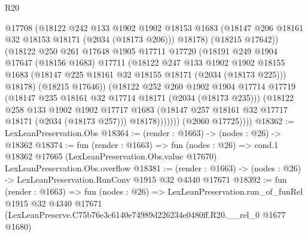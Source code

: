 \begin{lexlean}{R20}
\begin{coremodule}
                    @17708
                    (@18122
                      @242
                      @133
                      @1902
                      @1902
                      @18153
                      @1683
                      (@18147 @206 @18161 @32 @18153 @18171 (@2034 (@18173 @206)))
                      @18178)
                    (@18215 @17642))
                  (@18122
                    @250
                    @261
                    @17648
                    @1905
                    @17711
                    @17720
                    (@18191
                      @249
                      @1904
                      @17647
                      (@18156 @1683)
                      @17711
                      (@18122
                        @247
                        @133
                        @1902
                        @1902
                        @18155
                        @1683
                        (@18147 @225 @18161 @32 @18155 @18171 (@2034 (@18173 @225)))
                        @18178)
                      (@18215 @17646))
                    (@18122
                      @252
                      @260
                      @1902
                      @1904
                      @17714
                      @17719
                      (@18147 @235 @18161 @32 @17714 @18171 (@2034 (@18173 @235)))
                      (@18122
                        @258
                        @133
                        @1902
                        @1902
                        @17717
                        @1683
                        (@18147 @257 @18161 @32 @17717 @18171 (@2034 (@18173 @257)))
                        @18178)))))))
          (@2060 @17725))))
@18362 := LexLeanPreservation.Obs
@18364 := (render : @1663) -> (nodes : @26) -> @18362
@18374 := fun (render : @1663) =>
  fun (nodes : @26) =>
  cond.{1} @18362 @17665 (LexLeanPreservation.Obs.value @17670) LexLeanPreservation.Obs.overflow
@18381 := (render : @1663) -> (nodes : @26) -> LexLeanPreservation.RunConv @1915 @32 @4340 @17671
@18392 := fun (render : @1663) =>
  fun (nodes : @26) =>
  LexLeanPreservation.run_of_funRel
    @1915
    @32
    @4340
    @17671
    (LexLeanPreserve.C75b76e3c6140e74989d226234e0480ff.R20.__rel_0 @1677 @1680)
\end{coremodule}
\end{lexlean}
